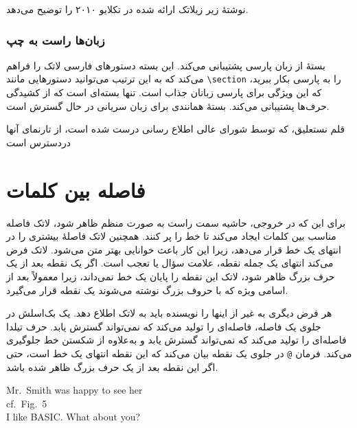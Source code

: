 نوشتهٔ زیر زیلاتک ارائه شده در تکلایو ۲۰۱۰ را توضیح می‌دهد.


\subsubsection{زبان‌ها راست به چپ}

بستهٔ  از زبان پارسی پشتیبانی می‌کند. این بسته دستورهای فارسی لاتک را فراهم می‌کند که به این ترتیب می‌توانید دستورهایی مانند \verb|\section| را به پارسی بکار ببرید، که این ویژگی برای پارسی زبانان جذاب است.  تنها بسته‌ای است که از کشیدگی حرف‌ها پشتیبانی می‌کند. بستهٔ همانندی برای زبان سریانی در حال گسترش است.

قلم نستعلیق، که توسط شورای عالی اطلاع رسانی درست شده است، از تارنمای آنها دردسترس است




\section{فاصله بین کلمات}
برای این که در خروجی، حاشیه سمت راست به صورت منظم ظاهر شود، لاتک فاصله مناسب بین کلمات ایجاد می‌کند تا خط را پر کنند. 
همچنین لاتک فاصلهٔ بیشتری را در انتهای یک خط قرار می‌دهد، زیرا این کار باعث خوانایی بهتر متن می‌شود. لاتک فرض می‌کند انتهای 
یک جمله نقطه، علامت سؤال یا تعجب است. اگر یک نقطه بعد از یک حرف بزرگ ظاهر شود، لاتک این نقطه را پایان یک خط نمی‌داند، 
زیرا معمولاً بعد از اسامی ویژه که با حروف بزرگ نوشته می‌شوند یک نقطه قرار می‌گیرد.

هر فرض دیگری به غیر از اینها را نویسنده باید به لاتک اطلاع دهد. یک بک‌اسلش در جلوی یک فاصله، فاصله‌ای را تولید می‌کند که نمی‌تواند گسترش یابد. حرف تیلدا فاصله‌ای را تولید می‌کند که نمی‌تواند گسترش یابد و به‌علاوه از شکستن خط جلوگیری می‌کند. فرمان 
\verb|@|
در جلوی یک نقطه بیان می‌کند که این نقطه انتهای یک خط است، حتی اگر این نقطه بعد از یک حرف بزرگ ظاهر شده باشد.

\begin{example}
Mr.~Smith was happy to see her\\
cf.~Fig.~5\\
I like BASIC\@. What about you?
\end{example}

